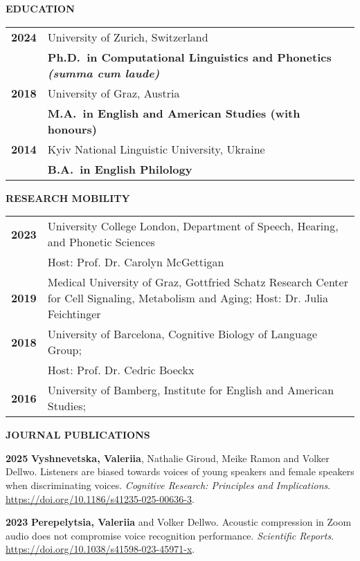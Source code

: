 \documentclass[11pt]{article}
\newcommand{\hangpara}{
 \setlength{\parindent}{0in} %
 \hangindent=0.42in %
}
\begin{document}
\vskip 12pt
\begin{flushleft}
{\bf EDUCATION}
\end{flushleft}
\begin{tabular}{lp{5.5in}}
\bf 2024 & University of Zurich, Switzerland \\
& \textbf{Ph.D.\ in Computational Linguistics and Phonetics \textit{(summa cum laude)}} \\
\bf 2018 & University of Graz, Austria \\
& \textbf{M.A.\ in English and American Studies (with honours)} \\
\bf 2014 & Kyiv National Linguistic University, Ukraine \\
& \textbf{B.A.\ in English Philology} \\
\end{tabular}


\vskip 12pt
\begin{flushleft}
{\bf RESEARCH MOBILITY}
\end{flushleft}
\begin{tabular}{lp{5.5in}}
\bf 2023 & University College London, Department of Speech, Hearing, and Phonetic Sciences \\
& Host: Prof. Dr. Carolyn McGettigan \\
\bf 2019 & Medical University of Graz, Gottfried Schatz Research Center for Cell Signaling, Metabolism and Aging; Host: Dr. Julia Feichtinger \\
\bf 2018 & University of Barcelona, Cognitive Biology of Language Group; \\
& Host: Prof. Dr. Cedric Boeckx \\
\bf 2016 & University of Bamberg, Institute for English and American Studies; \\ 
\end{tabular}



\vskip 18pt
\begin{flushleft}
{\bf JOURNAL PUBLICATIONS}
\end{flushleft}
\vskip 6pt
\hangpara
{\bf 2025}\hspace{1ex} \textbf{Vyshnevetska, Valeriia}, Nathalie Giroud, Meike Ramon and Volker Dellwo. Listeners are biased towards voices of young speakers and female speakers when discriminating voices. \textit{Cognitive Research: Principles and Implications}. \url{https://doi.org/10.1186/s41235-025-00636-3}.
\vskip 6pt
\hangpara
{\bf 2023}\hspace{1ex} \textbf{Perepelytsia, Valeriia} and Volker Dellwo. Acoustic compression in Zoom audio does not compromise voice recognition performance. \textit{Scientific Reports}. \url{https://doi.org/10.1038/s41598-023-45971-x}.
\end{document}
